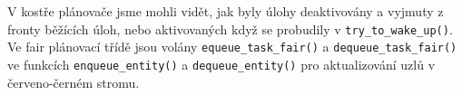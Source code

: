\documentclass[a4paper,12pt]{article}
\begin{document}
%
%
%
%
%
%
%
%
%
%
%
%
%
%
%

V kostře plánovače jsme mohli vidět, jak byly úlohy deaktivovány a vyjmuty z fronty běžících úloh, nebo aktivovaných když se probudily v \verb#try_to_wake_up()#. Ve fair plánovací třídě jsou volány \verb#equeue_task_fair()# a \verb#dequeue_task_fair()# ve funkcích \verb#enqueue_entity()# a \verb#dequeue_entity()# pro aktualizování uzlů v červeno-černém stromu.
\end{document}
